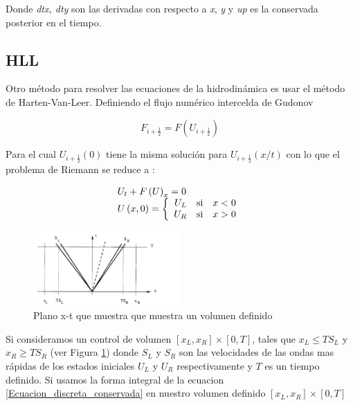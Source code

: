 \documentclass[12pt,a4paper]{book}
\begin{document}
Donde \emph{dtx, dty} son las derivadas con respecto a \emph{x}, \emph{y} y \emph{up} es la conservada posterior en el tiempo.



\subsection{HLL}

	Otro método para resolver las ecuaciones de la hidrodinámica es usar el método de Harten-Van-Leer. Definiendo el flujo numérico intercelda de Gudonov

\begin{equation}
F_{i+\frac{1}{2}}=F \left( U_{i+\frac{1}{2}} \right)
\end{equation}

Para el cual $U_{i+\frac{1}{2}}(0)$ tiene la misma solución para $U_{i+\frac{1}{2}}(x/t)$ con lo que el problema de Riemann se reduce a :

\begin{equation} \label{Ecuacion_discreta_conservada}
\begin{array}{ll}
U_t + F \left( U \right)_x = 0 \\
U \left(x,0 \right) = 
\left\lbrace
\begin{array}{rr}
U_L \quad \textup{si} \quad x<0  \\
U_R \quad \textup{si} \quad x>0
\end{array}
\right.
\end{array}
\end{equation}

\begin{figure} %
  \centering
    \includegraphics[width=0.5\textwidth]{Figuras/HLL_onda.png}
  \caption{Plano x-t que muestra que muestra un volumen definido}
  \label{fig:Plano x_t}
\end{figure}

Si consideramos un control de volumen $\left[x_L, x_R \right]\times \left[ 0 , T \right]$, tales que $x_L \leq TS_L$ y $x_R \geq TS_R$ (ver Figura \ref{fig:Plano x_t}) donde $S_L$ y $S_R$ son las velocidades de las ondas mas rápidas de los 
estados iniciales $U_L$ y $U_R$ respectivamente y $T$ es un tiempo definido. Si usamos la forma integral de la 
ecuacion \ref{Ecuacion_discreta_conservada} en nuestro volumen definido $\left[x_L, x_R \right]\times \left[ 0 , T \right]$
\end{document}

